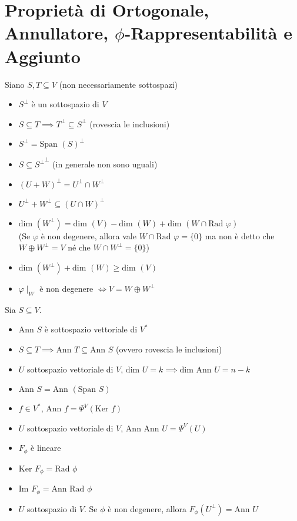 \documentclass[a4paper,NoNotes]{stdmdoc}
\newcommand{\Ker}{\mbox{Ker } }
\newcommand{\Dim}{\mbox{dim }}
\newcommand{\Rad}{\mbox{Rad }}
\newcommand{\Ann}{\mbox{Ann }}
\newcommand{\Span}{\mbox{Span }}
\newcommand{\Img}{\mbox{Im }}
\newcommand{\sse}{\Leftrightarrow}
\newcommand{\fucknullset}{\{0\}}
\begin{document}
	\section*{Proprietà di Ortogonale, Annullatore, $\phi$-Rappresentabilità e Aggiunto}
	 Siano $S, T \subseteq V$ (non necessariamente sottospazi)
	\begin{itemize}
		\item $S^\bot$ è un sottospazio di $V$
		\item $S \subseteq T \implies T^\bot \subseteq S^\bot$ (rovescia le inclusioni)
		\item $S^\bot = {\Span(S)}^\bot$
		\item $S \subseteq {S^\bot}^\bot$ (in generale non sono uguali)
		\item $(U + W)^\bot = U^\bot \cap W^\bot$
		\item $U^\bot + W^\bot \subseteq (U \cap W)^\bot$
		\item $\Dim(W^\bot) = \Dim(V) - \Dim(W) + \Dim(W \cap \Rad\varphi)$ \\ (Se $\varphi$ è non degenere, allora vale $W \cap \Rad \varphi = \fucknullset$ ma non è detto che $W \oplus W^\bot = V$ né che $W \cap W^\bot = \fucknullset$)
		\item $\Dim(W^\bot) + \Dim(W) \ge \Dim(V)$
		\item $\varphi\mid_W$ è non degenere $\sse V = W \oplus W^\bot$
	\end{itemize}

	\newpage
	 Sia $S \subseteq V$.
	\begin{itemize}
		\item $\Ann S$ è sottospazio vettoriale di $V^{*}$
		\item $S \subseteq T \implies \Ann T \subseteq \Ann S$ (ovvero rovescia le inclusioni)
		\item $U$ sottospazio vettoriale di $V$, $\Dim U = k \implies \Dim \Ann U = n - k$
		\item $\Ann S = \Ann (\Span S)$
		\item $f \in V^{*}$, $\Ann f = \Psi^{V}(\Ker f)$
		\item $U$ sottospazio vettoriale di $V$, $\Ann \Ann U = \Psi^{V} (U)$
	\end{itemize}

	\begin{itemize}
		\item $F_{\phi}$ è lineare
		\item $\Ker F_{\phi} = \Rad \phi$
		\item $\Img F_{\phi} = \Ann \Rad \phi$
		\item $U$ sottospazio di $V$. Se $\phi$ è non degenere, allora $F_{\phi}(U^\bot) = \Ann U$
	\end{itemize}
\end{document}

